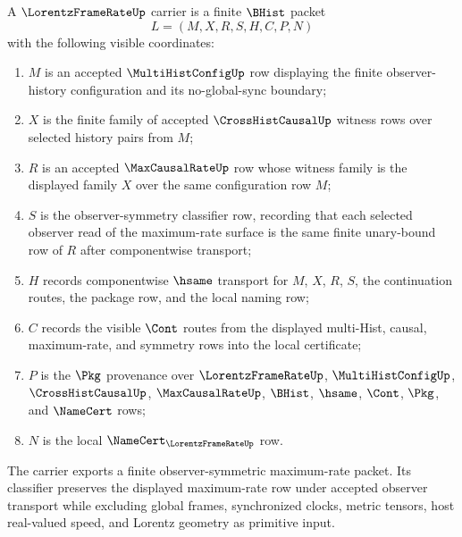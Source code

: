 \begin{definition}
\label{def:lorentz-frame-rate-carrier}
A $\LorentzFrameRateUp$ carrier is a finite $\BHist$ packet
$$
L=(M,X,R,S,H,C,P,N)
$$
with the following visible coordinates:
\begin{enumerate}
\item $M$ is an accepted $\MultiHistConfigUp$ row displaying the finite observer-history configuration and its no-global-sync boundary;
\item $X$ is the finite family of accepted $\CrossHistCausalUp$ witness rows over selected history pairs from $M$;
\item $R$ is an accepted $\MaxCausalRateUp$ row whose witness family is the displayed family $X$ over the same configuration row $M$;
\item $S$ is the observer-symmetry classifier row, recording that each selected observer read of the maximum-rate surface is the same finite unary-bound row of $R$ after componentwise transport;
\item $H$ records componentwise $\hsame$ transport for $M$, $X$, $R$, $S$, the continuation routes, the package row, and the local naming row;
\item $C$ records the visible $\Cont$ routes from the displayed multi-Hist, causal, maximum-rate, and symmetry rows into the local certificate;
\item $P$ is the $\Pkg$ provenance over $\LorentzFrameRateUp$, $\MultiHistConfigUp$, $\CrossHistCausalUp$, $\MaxCausalRateUp$, $\BHist$, $\hsame$, $\Cont$, $\Pkg$, and $\NameCert$ rows;
\item $N$ is the local $\NameCert_{\LorentzFrameRateUp}$ row.
\end{enumerate}
The carrier exports a finite observer-symmetric maximum-rate packet. Its classifier preserves the displayed maximum-rate row under accepted observer transport while excluding global frames, synchronized clocks, metric tensors, host real-valued speed, and Lorentz geometry as primitive input.
\end{definition}


